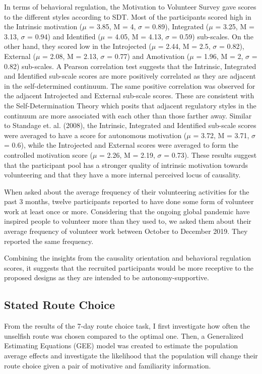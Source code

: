 In terms of behavioral regulation, the Motivation to Volunteer Survey  gave scores to the different styles according to SDT. Most of the participants scored high in the Intrinsic motivation ($\mu$ =  3.85, M = 4, $\sigma$ = 0.89), Integrated ($\mu$ =  3.25, M = 3.13, $\sigma$ = 0.94) and Identified ($\mu$ =  4.05, M = 4.13, $\sigma$ = 0.59) sub-scales. On the other hand, they scored low in the Introjected ($\mu$ =  2.44, M = 2.5, $\sigma$ = 0.82), External ($\mu$ =  2.08, M = 2.13, $\sigma$ = 0.77) and Amotivation ($\mu$ =  1.96, M = 2, $\sigma$ = 0.82) sub-scales. A Pearson correlation test suggests that the Intrinsic, Integrated and Identified sub-scale scores are more positively correlated as they are adjacent in the self-determined continuum. The same positive correlation was observed for the adjacent Introjected and External sub-scale scores. These are consistent with the Self-Determination Theory which posits that adjacent regulatory styles in the continuum are more associated with each other than those farther away\cite{ryan1989perceived}. Similar to Standage et. al. (2008)\cite{standage2008does}, the Intrinsic, Integrated and Identified sub-scale scores were averaged to have a score for autonomous motivation ($\mu$ =  3.72, M = 3.71, $\sigma$ = 0.6), while the Introjected and External scores were averaged to form the controlled motivation score ($\mu$ =  2.26, M = 2.19, $\sigma$ = 0.73). These results suggest that the participant pool has a stronger quality of intrinsic motivation towards volunteering and that they have a more internal perceived locus of causality. 

When asked about the average frequency of their volunteering activities for the past 3 months, twelve participants reported to have done some form of volunteer work at least once or more. Considering that the ongoing global pandemic have inspired people to volunteer more than they used to, we asked them about their average frequency of volunteer work between October to December 2019. They reported the same frequency. 

Combining the insights from the causality orientation and behavioral regulation scores, it suggests that the recruited participants would be more receptive to the proposed designs as they are intended to be autonomy-supportive. 

\subsection{Stated Route Choice}
From the results of the 7-day route choice task, I first investigate how often the unselfish route was chosen compared to the optimal one. Then, a Generalized Estimating Equations (GEE) model was created to estimate the population average effects and investigate the likelihood that the population will change their route choice given a pair of motivative and familiarity information. 

